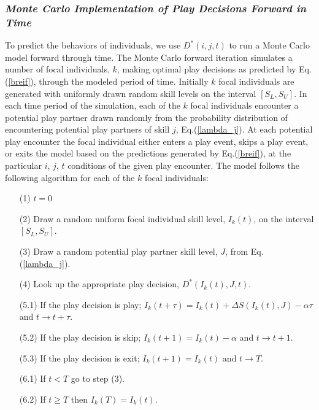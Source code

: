 \documentclass[12pt, letterpaper, fleqn]{article}
\begin{document}
      
    \subsubsection*{\it Monte Carlo Implementation of Play Decisions Forward in Time}  
      To predict the behaviors of individuals, we use $D^*(i,j,t)$ to run a Monte Carlo model forward through time. 
      The Monte Carlo forward iteration simulates a number of focal individuals, $k$, making optimal play decisions as predicted by Eq.(\ref{breif}), through the modeled period of time. 
      Initially $k$ focal individuals are generated with uniformly drawn random skill levels on the interval $[S_L,S_U]$. 
      In each time period of the simulation, each of the $k$ focal individuals encounter a potential play partner drawn randomly from the probability distribution of encountering potential play partners of skill $j$, Eq.(\ref{lambda_j}). 
      At each potential play encounter the focal individual either enters a play event, skips a play event, or exits the model based on the predictions generated by Eq.(\ref{breif}), at the particular $i$, $j$, $t$ conditions of the given play encounter.  
      The model follows the following algorithm for each of the $k$ focal individuals:
      \begin{itemize}
      \item[(1)] $t=0$
      \item[(2)] Draw a random uniform focal individual skill level, $I_k(t)$, on the interval $[S_L,S_U]$.   
      \item[(3)] Draw a random potential play partner skill level, $J$, from Eq.(\ref{lambda_j}).
      \item[(4)] Look up the appropriate play decision, $D^*(I_k(t),J,t)$.
      \item[(5.1)] If the play decision is play; $I_k(t+\tau)=I_{k}(t)+\Delta S(I_k(t),J)-\alpha \tau$ and $t \rightarrow t+\tau$. 
      \item[(5.2)] If the play decision is skip; $I_k(t+1)=I_{k}(t)-\alpha$ and $t \rightarrow t+1$.
      \item[(5.3)] If the play decision is exit; $I_k(t+1)=I_{k}(t)$ and $t \rightarrow T$.
      \item[(6.1)] If $t < T$ go to step (3). 
      \item[(6.2)] If $t \ge T$ then $I_k(T)=I_k(t)$.   
      \end{itemize}
  
\end{document}
